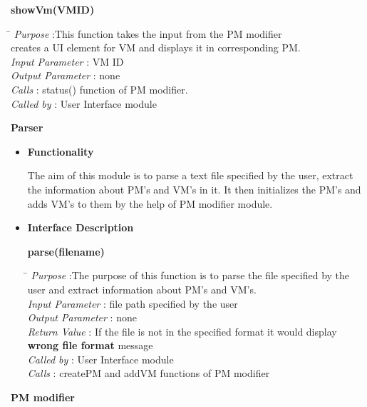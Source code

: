 \documentclass[a4paper,11pt]{article}
\begin{document}
\textbf{showVm(VM\textunderscore ID)}  
\begin{tabbing}
\hspace*{4cm}\= \kill
 \textit{Purpose} \> :This function takes the input from the PM modifier \\ \>creates a UI element for VM and displays it in corresponding PM.\\
  \textit{Input Parameter} \> : VM ID \\
  \textit{Output Parameter} \> : none \\
  \textit{Calls} \> : status() function of PM modifier. \\
  \textit{Called by} \> : User Interface module
  
\end{tabbing}
\textbf{Parser}
\begin{itemize}
\item \textbf{Functionality}

The aim of this module is to parse a text file specified by the user, extract the information about PM's and VM's in it.
It then initializes the PM's and adds VM's to them by the help of PM modifier module.

\item \textbf{Interface Description}

\textbf{parse(filename)}
  
\begin{tabbing}
\hspace*{4cm}\= \kill
 \textit{Purpose} \> :The purpose of this function is to parse the file specified by the \\ \>user and extract information about PM's and VM's.\\
  \textit{Input Parameter} \> : file path specified by the user \\
  \textit{Output Parameter} \> : none \\
  \textit{Return Value} \> : If the file is not in the specified format it would display \\ \>\textbf{wrong file format} message \\
  \textit{Called by} \> : User Interface module \\
  \textit{Calls} \> : createPM and addVM functions of PM modifier\\
\end{tabbing}
\end{itemize}
\textbf{PM modifier}
\end{document}
